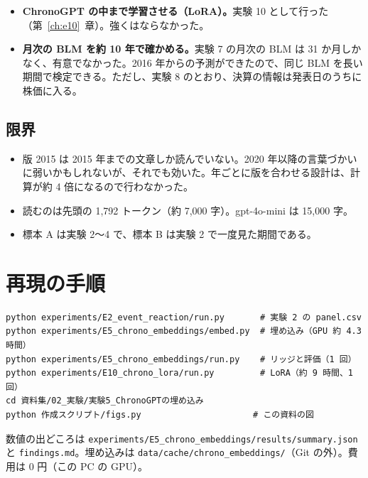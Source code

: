 \documentclass[xelatex,ja=standard,jafont=haranoaji,a4paper,10pt,openany]{bxjsreport}
\newcommand{\code}[1]{\texttt{#1}}
\newcommand{\chapref}[1]{第~\ref{#1}~章}
\begin{document}
\begin{itemize}
\item \textbf{ChronoGPT の中まで学習させる（LoRA）。}実験 10 として行った（\chapref{ch:e10}）。強くはならなかった。
\item \textbf{月次の BLM を約 10 年で確かめる。}実験 7 の月次の BLM は 31 か月しかなく、有意でなかった。2016 年からの予測ができたので、同じ BLM を長い期間で検定できる。ただし、実験 8 のとおり、決算の情報は発表日のうちに株価に入る。
\end{itemize}

\section{限界}

\begin{itemize}
\item 版 2015 は 2015 年までの文章しか読んでいない。2020 年以降の言葉づかいに弱いかもしれないが、それでも効いた。年ごとに版を合わせる設計は、計算が約 4 倍になるので行わなかった。
\item 読むのは先頭の 1,792 トークン（約 7,000 字）。gpt-4o-mini は 15,000 字。
\item 標本 A は実験 2〜4 で、標本 B は実験 2 で一度見た期間である。
\end{itemize}

\chapter*{再現の手順}

\begin{verbatim}
python experiments/E2_event_reaction/run.py       # 実験 2 の panel.csv
python experiments/E5_chrono_embeddings/embed.py  # 埋め込み（GPU 約 4.3 時間）
python experiments/E5_chrono_embeddings/run.py    # リッジと評価（1 回）
python experiments/E10_chrono_lora/run.py         # LoRA（約 9 時間、1 回）
cd 資料集/02_実験/実験5_ChronoGPTの埋め込み
python 作成スクリプト/figs.py                      # この資料の図
\end{verbatim}

数値の出どころは \code{experiments/E5\_chrono\_embeddings/results/summary.json} と \code{findings.md}。埋め込みは \code{data/cache/chrono\_embeddings/}（Git の外）。費用は 0 円（この PC の GPU）。
\end{document}
